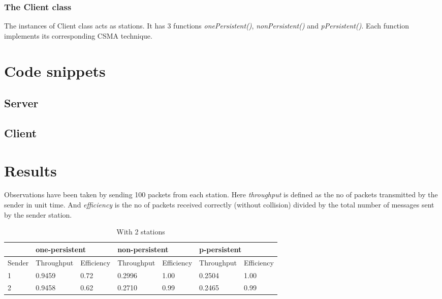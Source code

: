 \documentclass[14pt,titlepage, a4paper]{extarticle}
\begin{document}
\subsubsection{The Client class}
The instances of Client class acts as stations. It has 3 functions 
\emph{onePersistent()}, \emph{nonPersistent()} and \emph{pPersistent()}.
Each function implements its corresponding CSMA technique.

\par\null\par
{}



\section{Code snippets}
\subsection{Server}

\subsection{Client}


\section{Results}
Observations have been taken by sending 100 packets from each station.
Here \emph{throughput} is defined as the no of packets transmitted by the sender
in unit time. And \emph{efficiency} is the no of packets received correctly
(without collision) divided by the total number of messages sent by the sender station.

\begin{table}[!ht]
	\caption{With 2 stations}
	\bigskip
	\begin{tabular}{|l|l|l|l|l|l|l|}
		\hline
		&
		\multicolumn{2}{|l|}{one-persistent} & 
		\multicolumn{2}{|l|}{non-persistent} & 
		\multicolumn{2}{|l|}{p-persistent}\\
		\hline
		Sender &
		Throughput & Efficiency & 
		Throughput & Efficiency & 
		Throughput & Efficiency \\ 
		\hline
		1 & 
		0.9459 & 0.72 &
		0.2996 & 1.00 & 
		0.2504 & 1.00\\
		\hline
		2 &
		0.9458 & 0.62 & 
		0.2710 & 0.99 
		& 0.2465 & 0.99\\
		\hline
	\end{tabular}
\end{table}
\end{document}
